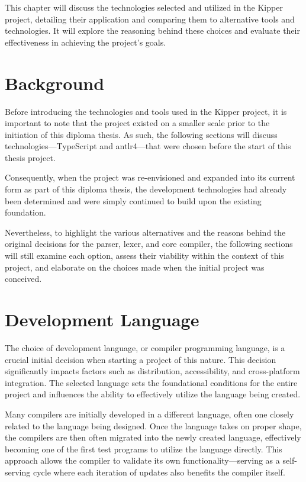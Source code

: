 
This chapter will discuss the technologies selected and utilized in the Kipper project, detailing their application and comparing them to alternative tools and technologies. It will explore the reasoning behind these choices and evaluate their effectiveness in achieving the project's goals.

\section{Background}
\label{sec:technology-background}

Before introducing the technologies and tools used in the Kipper project, it is important to note that the project existed on a smaller scale prior to the initiation of this diploma thesis. As such, the following sections will discuss technologies—TypeScript and \Gls{antlr4}—that were chosen before the start of this thesis project. 

Consequently, when the project was re-envisioned and expanded into its current form as part of this diploma thesis, the development technologies had already been determined and were simply continued to build upon the existing foundation.

Nevertheless, to highlight the various alternatives and the reasons behind the original decisions for the parser, lexer, and core compiler, the following sections will still examine each option, assess their viability within the context of this project, and elaborate on the choices made when the initial project was conceived.

\section{Development Language}
\label{sec:development-language}

The choice of development language, or compiler programming language, is a crucial initial decision when starting a project of this nature. This decision significantly impacts factors such as distribution, accessibility, and cross-platform integration. The selected language sets the foundational conditions for the entire project and influences the ability to effectively utilize the language being created.

Many compilers are initially developed in a different language, often one closely related to the language being designed. Once the language takes on proper shape, the compilers are then often migrated into the newly created language, effectively becoming one of the first test programs to utilize the language directly. This approach allows the compiler to validate its own functionality—serving as a self-serving cycle where each iteration of updates also benefits the compiler itself.

